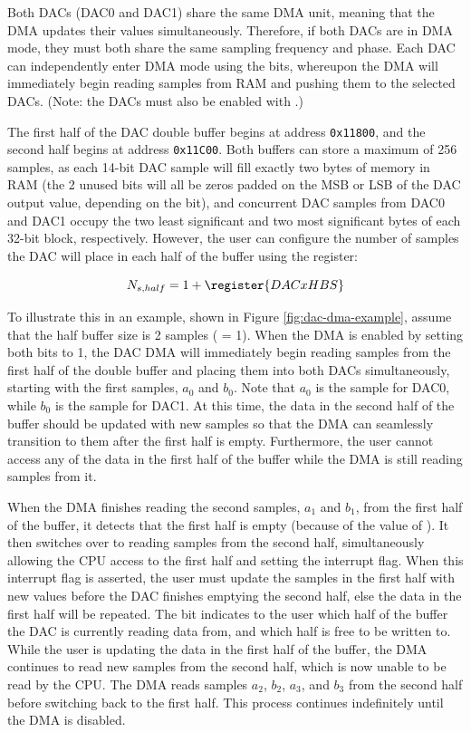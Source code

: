 Both DACs (DAC0 and DAC1) share the same DMA unit, meaning that the DMA updates their values simultaneously. Therefore, if both DACs are in DMA mode, they must both share the same sampling frequency and phase. Each DAC can independently enter DMA mode using the  bits, whereupon the DMA will immediately begin reading samples from RAM and pushing them to the selected DACs. (Note: the DACs must also be enabled with .) 

The first half of the DAC double buffer begins at address \texttt{0x11800}, and the second half begins at address \texttt{0x11C00}. Both buffers can store a maximum of 256 samples, as each 14-bit DAC sample will fill exactly two bytes of memory in RAM (the 2 unused bits will all be zeros padded on the MSB or LSB of the DAC output value, depending on the  bit), and concurrent DAC samples from DAC0 and DAC1 occupy the two least significant and two most significant bytes of each 32-bit block, respectively. However, the user can configure the number of samples the DAC will place in each half of the buffer using the  register:

\begin{equation*}
	N_{s,half} = 1 + \register{DACxHBS}
\end{equation*}

To illustrate this in an example, shown in Figure \ref{fig:dac-dma-example}, assume that the half buffer size is 2 samples ( = 1). When the DMA is enabled by setting both  bits to 1, the DAC DMA will immediately begin reading samples from the first half of the double buffer and placing them into both DACs simultaneously, starting with the first samples, $a_0$ and $b_0$. Note that $a_0$ is the sample for DAC0, while $b_0$ is the sample for DAC1. At this time, the data in the second half of the buffer should be updated with new samples so that the DMA can seamlessly transition to them after the first half is empty. Furthermore, the user cannot access any of the data in the first half of the buffer while the DMA is still reading samples from it.

When the DMA finishes reading the second samples, $a_1$ and $b_1$, from the first half of the buffer, it detects that the first half is empty (because of the value of ). It then switches over to reading samples from the second half, simultaneously allowing the CPU access to the first half and setting the  interrupt flag. When this interrupt flag is asserted, the user must update the samples in the first half with new values before the DAC finishes emptying the second half, else the data in the first half will be repeated. The  bit indicates to the user which half of the buffer the DAC is currently reading data from, and which half is free to be written to. While the user is updating the data in the first half of the buffer, the DMA continues to read new samples from the second half, which is now unable to be read by the CPU. The DMA reads samples $a_2$, $b_2$, $a_3$, and $b_3$ from the second half before switching back to the first half. This process continues indefinitely until the DMA is disabled.

